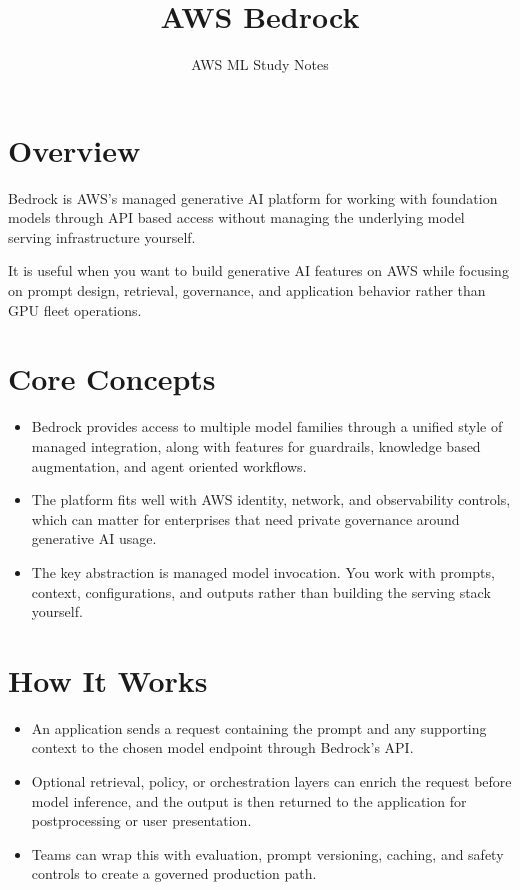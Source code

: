 \documentclass[10pt,twocolumn]{article}
\begin{document}
\title{\vspace{-1.6cm}AWS Bedrock}
\author{AWS ML Study Notes}
\date{}
\maketitle
\small

\section*{Overview}
Bedrock is AWS's managed generative AI platform for working with foundation models through API based access without managing the underlying model serving infrastructure yourself.

It is useful when you want to build generative AI features on AWS while focusing on prompt design, retrieval, governance, and application behavior rather than GPU fleet operations.

\section*{Core Concepts}
\begin{itemize}
\item Bedrock provides access to multiple model families through a unified style of managed integration, along with features for guardrails, knowledge based augmentation, and agent oriented workflows.
\item The platform fits well with AWS identity, network, and observability controls, which can matter for enterprises that need private governance around generative AI usage.
\item The key abstraction is managed model invocation. You work with prompts, context, configurations, and outputs rather than building the serving stack yourself.
\end{itemize}

\section*{How It Works}
\begin{itemize}
\item An application sends a request containing the prompt and any supporting context to the chosen model endpoint through Bedrock's API.
\item Optional retrieval, policy, or orchestration layers can enrich the request before model inference, and the output is then returned to the application for postprocessing or user presentation.
\item Teams can wrap this with evaluation, prompt versioning, caching, and safety controls to create a governed production path.
\end{itemize}
\end{document}
